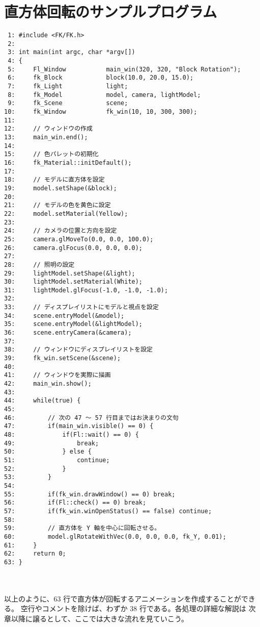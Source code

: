 \section{直方体回転のサンプルプログラム}
\begin{breakbox}
\begin{small}
\begin{verbatim}
 1: #include <FK/FK.h>
 2:
 3: int main(int argc, char *argv[])
 4: {
 5:     Fl_Window           main_win(320, 320, "Block Rotation");
 6:     fk_Block            block(10.0, 20.0, 15.0);
 7:     fk_Light            light;
 8:     fk_Model            model, camera, lightModel;
 9:     fk_Scene            scene;
10:     fk_Window           fk_win(10, 10, 300, 300);
11: 
12:     // ウィンドウの作成
13:     main_win.end();             
14: 
15:     // 色パレットの初期化
16:     fk_Material::initDefault();          
17: 
18:     // モデルに直方体を設定
19:     model.setShape(&block);
20: 
21:     // モデルの色を黄色に設定
22:     model.setMaterial(Yellow);
23: 
24:     // カメラの位置と方向を設定
25:     camera.glMoveTo(0.0, 0.0, 100.0);
26:     camera.glFocus(0.0, 0.0, 0.0);
27: 
28:     // 照明の設定
29:     lightModel.setShape(&light);
30:     lightModel.setMaterial(White);
31:     lightModel.glFocus(-1.0, -1.0, -1.0);
32: 
33:     // ディスプレイリストにモデルと視点を設定
34:     scene.entryModel(&model);
35:     scene.entryModel(&lightModel);
36:     scene.entryCamera(&camera);
37: 
38:     // ウィンドウにディスプレイリストを設定
39:     fk_win.setScene(&scene);
40: 
41:     // ウィンドウを実際に描画
42:     main_win.show();
43: 
44:     while(true) {
45: 
46:         // 次の 47 〜 57 行目まではお決まりの文句
47:         if(main_win.visible() == 0) {
48:             if(Fl::wait() == 0) {
49:                 break;
50:             } else {
51:                 continue;
52:             }
53:         }
54:
55:         if(fk_win.drawWindow() == 0) break;
56:         if(Fl::check() == 0) break;
57:         if(fk_win.winOpenStatus() == false) continue;
58: 
59:         // 直方体を Y 軸を中心に回転させる。
60:         model.glRotateWithVec(0.0, 0.0, 0.0, fk_Y, 0.01);
61:     }
62:     return 0;
63: }
\end{verbatim}
\end{small}
\end{breakbox}

~ \\ ~ \\
以上のように、63 行で直方体が回転するアニメーションを作成することができる。
空行やコメントを除けば、わずか 38 行である。各処理の詳細な解説は
次章以降に譲るとして、ここでは大きな流れを見ていこう。

